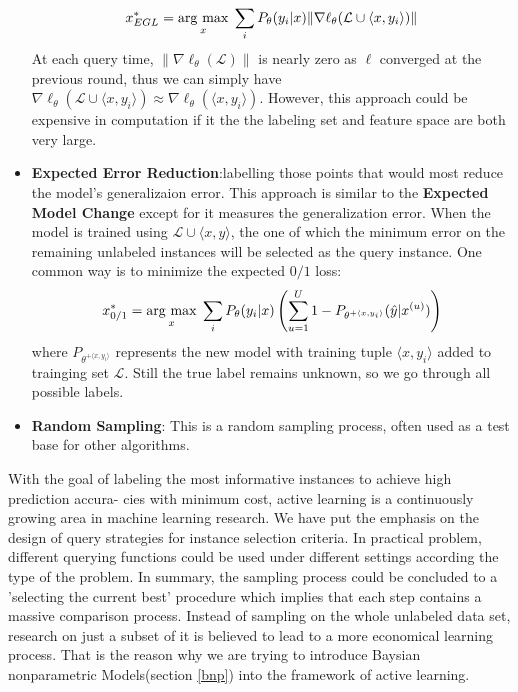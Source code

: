 \begin{itemize}
  \begin{equation}
    x_{EGL}^{*}=\underset{x}{\operatorname{arg}\,\operatorname{max}}\;\sum\limits_{i}P_\theta(y_i|x)\|\nabla\mathcal{\ell}_\theta(\mathcal{L}\cup\langle x,y_i\rangle)\|
  \end{equation}
  At each query time, $\|\nabla\ell_\theta(\mathcal{L})\|$ is nearly zero as $\ell$ converged at the previous round, thus we can simply have 
  $\nabla\mathcal{\ell}_\theta(\mathcal{L}\cup\langle x,y_i\rangle)\approx\nabla\mathcal{\ell}_\theta(\langle x,y_i\rangle)$.
  However, this approach could be expensive in computation if it the the labeling set and feature space are both very large.
  \item \textbf{Expected Error Reduction}:labelling those points that would most reduce the model's generalizaion error. This approach is similar to the \textbf{Expected Model Change} except for it measures the generalization error. When the model is trained using $\mathcal{L}\cup\langle x,y \rangle $, the one of which the minimum error on the remaining unlabeled instances will be selected as the query instance. One common way is to minimize the expected $0/1$ loss:
  \begin{equation}
   x_{0/1}^{*}=\underset{x}{\operatorname{arg}\,\operatorname{max}}\;\sum\limits_{i}P_\theta(y_i|x)\left (\sum\limits_{u=1}^{U}1- P_{\theta^{+\langle x,y_i\rangle} }(\hat{y}|x^{(u)})\right )
  \end{equation}
  where $P_{\theta^{+\langle x,y_i\rangle}}$ represents the new model with training tuple $\langle x,y_i\rangle$ added to trainging set $\mathcal{L}$. Still the true label remains unknown, so we go through all possible labels. 
  \item \textbf{Random Sampling}: This is a random sampling process, often used as a test base for other algorithms.
\end{itemize}

With the goal of labeling the most informative instances to achieve high prediction accura- cies with minimum cost, active learning is a continuously growing area in machine learning research. We have put the emphasis on the design of  query strategies for instance selection criteria. In practical problem, different querying functions could be used under different settings according the type of the problem. 
In summary, the sampling process could be concluded to a 'selecting the current best' procedure which implies that each step contains a massive comparison process. Instead of sampling on the whole unlabeled data set, research on just a subset of it is believed to lead to a more economical learning process\cite{Settles2010,cohn1994improving,meyers1993promoting}.
That is the reason why we are trying to introduce Baysian nonparametric Models(section \ref{bnp}) into the framework of active learning.


